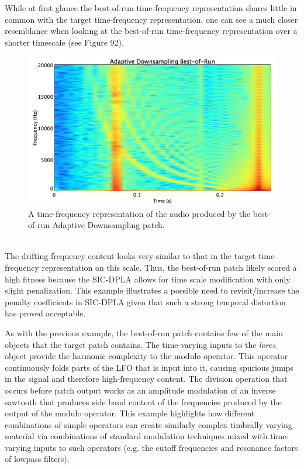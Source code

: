 \documentclass[12pt]{report} 	%
\numberwithin{figure}{chapter}
\numberwithin{table}{chapter}
\numberwithin{equation}{chapter}
\begin{document}
\begin{flushleft}
While at first glance the best-of-run time-frequency representation shares little in common with the target time-frequency representation, one can see a much closer resemblance when looking at the best-of-run time-frequency representation over a shorter timescale (see Figure 92).
\begin{figure}[h!]
\begin{center}
\includegraphics[scale=0.35,width=\linewidth]{AdaptiveDownsamplingBestOfRunSTFT2}
\caption[Zooming in on the best-of-run adaptive downsampling time-frequency representation]{A time-frequency representation of the audio produced by the best-of-run Adaptive Downsampling patch.}
\end{center}
\end{figure}
\\
The drifting frequency content looks very similar to that in the target time-frequency representation on this scale. Thus, the best-of-run patch likely scored a high fitness because the SIC-DPLA allows for time scale modification with only slight penalization. This example illustrates a possible need to revisit/increase the penalty coefficients in SIC-DPLA given that such a strong temporal distortion has proved acceptable.

As with the previous example, the best-of-run patch contains few of the main objects that the target patch contains. The time-varying inputs to the \textit{lores\texttildelow{}} object provide the harmonic complexity to the modulo operator. This operator continuously folds parts of the LFO that is input into it, causing spurious jumps in the signal and therefore high-frequency content. The division operation that occurs before patch output works as an amplitude modulation of an inverse sawtooth that produces side band content of the frequencies produced by the output of the modulo operator. This example highlights how different combinations of simple operators can create similarly complex timbrally varying material via combinations of standard modulation techniques mixed with time-varying inputs to such operators (e.g. the cutoff frequencies and resonance factors of lowpass filters). 


\end{flushleft}
\end{document}
